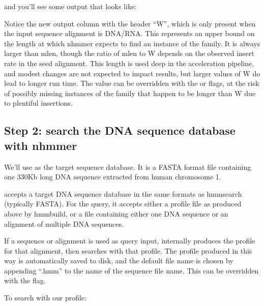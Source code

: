 and you'll see some output that looks like:



Notice the new output column with the header ``W'', which is only
present when the input sequence alignment is DNA/RNA. This represents
an upper bound on the length at which nhmmer expects to find an
instance of the family.  It is always larger than mlen,
though the ratio of mlen to W depends on the observed insert rate in
the seed alignment. This length is used deep in the acceleration
pipeline, and modest changes are not expected to impact results, but
larger values of W do lead to longer run time. The value can be
overridden with the  or  flags, at
the risk of possibly missing instances of the family that happen to be
longer than W due to plentiful insertions.



\subsection{Step 2: search the DNA sequence database with nhmmer}

We'll use  as the target sequence
database. It is a FASTA format file containing one 330Kb long DNA
sequence extracted from human chromosome 1.

 accepts a target DNA sequence database in the same
formats as hmmsearch (typically FASTA). For the query, it accepts
either a profile file as produced above by hmmbuild, or a file
containing either one DNA sequence or an alignment of multiple DNA
sequences.

If a sequence or alignment is used as query input, 
internally produces the profile for that alignment, then searches with that
profile. The profile produced in this way is automatically saved to
disk, and the default file name is chosen by appending ``.hmm'' to the
name of the sequence file name. This can be overridden with the
 flag.

To search  with our  profile:

   \vspace{1ex}
   \vspace{1ex}

